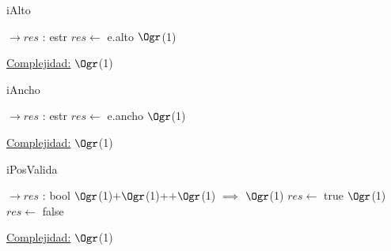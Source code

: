 \begin{Representacion}
\begin{Algoritmos}
\begin{algorithm}[H]
	\end{algorithm}
	
	\begin{algorithm}[H]
		\caption{iAlto}
		
		\begin{algorithmic}[1]
			 $\to res$ : estr
			\State $res \leftarrow$ e.alto \Comment $\Ogr$(1)
			\EndProcedure
		\end{algorithmic}
		\underline{Complejidad:} $\Ogr$(1)
		
	\end{algorithm}
	
	\begin{algorithm}[H]
		\caption{iAncho}
		
		\begin{algorithmic}[1]
			 $\to res$ : estr
			\State $res \leftarrow$ e.ancho \Comment $\Ogr$(1)
			\EndProcedure
		\end{algorithmic}
		\underline{Complejidad:} $\Ogr$(1)
		
	\end{algorithm}
	
	\begin{algorithm}[H]
		\caption{iPosValida}
		
		\begin{algorithmic}[1]
			 $\to res$ : bool
			 \Comment $\Ogr$(1)$+$$\Ogr$(1)+$+$$\Ogr$(1) $\implies$ $\Ogr$(1)
				\State $res \leftarrow$ true
			\Else	\Comment $\Ogr$(1)
				\State $res \leftarrow$ false
				\EndIf
			\EndProcedure
		\end{algorithmic}
		\underline{Complejidad:} $\Ogr$(1)
		
	\end{algorithm}
	
\end{Algoritmos}
\end{Representacion}
